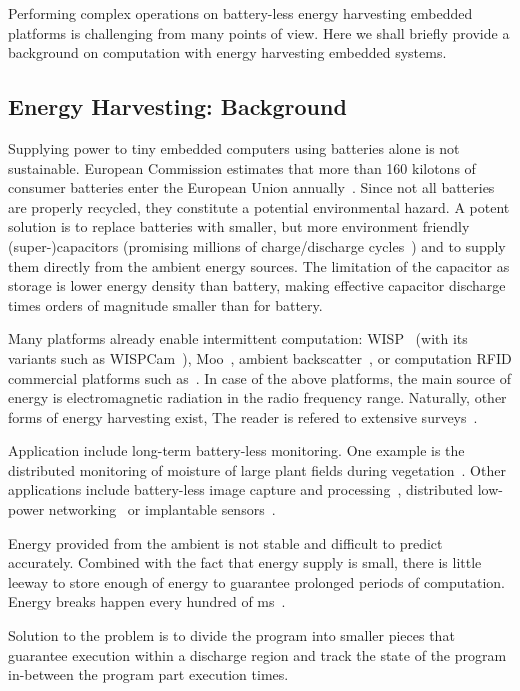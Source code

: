 Performing complex operations on battery-less energy harvesting embedded platforms is challenging from many points of view. Here we shall briefly provide a background on computation with energy harvesting embedded systems. 

\subsection{Energy Harvesting: Background}

Supplying power to tiny embedded computers using batteries alone is not sustainable. European Commission estimates that more than 160 kilotons of consumer batteries enter the European Union annually~\cite{eu_batteries_2016}. Since not all batteries are properly recycled, they constitute a potential environmental hazard. A potent solution is to replace batteries with smaller, but more environment friendly (super-)capacitors (promising millions of charge/discharge cycles~\cite[Sec. I]{ongaro_pwre_2012}) and to supply them directly from the ambient energy sources. The limitation of the capacitor as storage is lower energy density than battery, making effective capacitor discharge times orders of magnitude smaller than for battery.

Many platforms already enable intermittent computation: WISP~\cite{} (with its variants such as WISPCam~\cite{}), Moo~\cite{moo}, ambient backscatter~\cite{liu_sigcomm_2013}, or computation RFID commercial platforms such as~\cite{}. In case of the above platforms, the main source of energy is electromagnetic radiation in the radio frequency range. Naturally, other forms of energy harvesting exist, The reader is refered to extensive surveys~\cite{}.

Application include long-term battery-less monitoring. One example is the distributed monitoring of moisture of large plant fields during vegetation~\cite{}. Other applications include battery-less image capture and processing~\cite{}, distributed low-power networking~\cite{} or implantable sensors~\cite{rodriguez_tbcs_2015}.

Energy provided from the ambient is not stable and difficult to predict accurately. Combined with the fact that energy supply is small, there is little leeway to store enough of energy to guarantee prolonged periods of computation. Energy breaks happen every hundred of ms~\cite{}.

Solution to the problem is to divide the program into smaller pieces that guarantee execution within a discharge region and track the state of the program in-between the program part execution times. 

